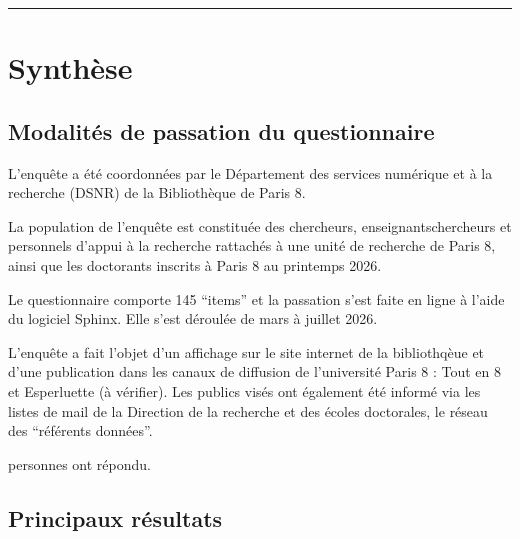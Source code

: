 \documentclass[letterpaper,10pt,english]{jupyterBook}
\begin{document}
\bigskip\hrule\bigskip


\sphinxstepscope


\part{Synthèse}

\sphinxstepscope


\chapter{Modalités de passation du questionnaire}
\label{\detokenize{methode:modalites-de-passation-du-questionnaire}}\label{\detokenize{methode::doc}}
\sphinxAtStartPar
L’enquête a été coordonnées par le Département des services numérique et à la recherche (DSNR) de la Bibliothèque de Paris 8.

\sphinxAtStartPar
La population de l’enquête est constituée des chercheurs, enseignants\sphinxhyphen{}chercheurs et personnels d’appui à la recherche rattachés à une unité de recherche de Paris 8, ainsi que les doctorants inscrits à Paris 8 au printemps 2026.

\sphinxAtStartPar
Le questionnaire comporte 145 “items” et la passation s’est faite en ligne à l’aide du logiciel Sphinx. Elle s’est déroulée de mars à juillet 2026.

\sphinxAtStartPar
L’enquête a fait l’objet d’un affichage sur le site internet de la bibliothqèue et d’une publication dans les canaux de diffusion de l’université Paris 8 : Tout en 8 et Esperluette (à vérifier). Les publics visés ont également été informé via les listes de mail de la Direction de la recherche et des écoles doctorales, le réseau des “référents données”.

 personnes ont répondu.

\sphinxstepscope


\chapter{Principaux résultats}
\label{\detokenize{script_analyse/synthese/main_results:principaux-resultats}}\label{\detokenize{script_analyse/synthese/main_results::doc}}
\end{document}
